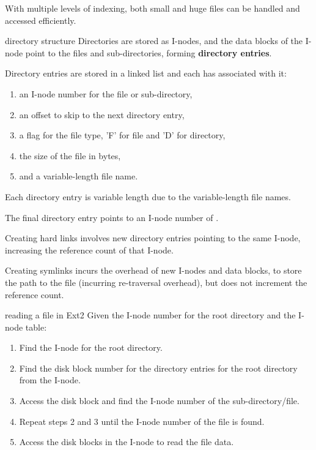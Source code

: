 With multiple levels of indexing, both small and huge files can be handled and accessed efficiently.

\begin{defn}{directory structure}
    Directories are stored as I-nodes, and the data blocks of the I-node point to the files and sub-directories, forming \textbf{directory entries}.

    Directory entries are stored in a linked list and each has associated with it:
    \begin{enumerate}
        \item an I-node number for the file or sub-directory,
        \item an offset to skip to the next directory entry,
        \item a flag for the file type, 'F' for file and 'D' for directory,
        \item the size of the file in bytes,
        \item and a variable-length file name.
    \end{enumerate}

    Each directory entry is variable length due to the variable-length file names.

    The final directory entry points to an I-node number of .
\end{defn}

Creating hard links involves new directory entries pointing to the same I-node, increasing the reference count of that I-node.

Creating symlinks incurs the overhead of new I-nodes and data blocks, to store the path to the file (incurring re-traversal overhead), but does not increment the reference count.

\begin{defn}{reading a file in Ext2}
    Given the I-node number for the root directory and the I-node table:

    \begin{enumerate}
        \item Find the I-node for the root directory.
        \item Find the disk block number for the directory entries for the root directory from the I-node.
        \item Access the disk block and find the I-node number of the sub-directory/file.
        \item Repeat steps 2 and 3 until the I-node number of the file is found.
        \item Access the disk blocks in the I-node to read the file data.
    \end{enumerate}
\end{defn}